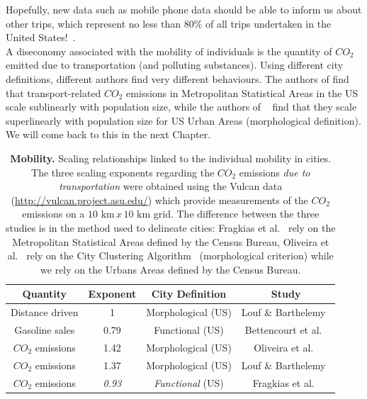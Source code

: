 Hopefully, new data such as mobile phone data should be
able to inform us about other trips, which represent no less than 80\% of all
trips undertaken in the United States!~\cite{FHWA-PL-11-022}.\\

A diseconomy associated with the mobility of individuals is the
quantity of $CO_2$ emitted due to transportation (and polluting substances).
Using different city definitions, different authors find very different
behaviours. The authors of \cite{Fragkias:2013} find that transport-related
$CO_2$ emissions in Metropolitan Statistical Areas in the US scale sublinearly
with population size, while the authors of
~\cite{Louf:2014_mobility,Oliveira:2014} find that they scale superlinearly with
population size for US Urban Areas (morphological definition). We will come back
to this in the next Chapter.

\begin{table}[!h]
    \centering
\begin{tabular}{|cccc|}
\hline
Quantity & Exponent & City Definition & Study\\
\hline
Distance driven & 1 & Morphological (US) & Louf \& Barthelemy~\cite{Louf:2014_scaling} \\
Gasoline sales & 0.79 & Functional (US) & Bettencourt et al.~\cite{Bettencourt:2007}\\
\hline
$CO_2$ emissions & 1.42 & Morphological (US) & Oliveira et al.~\cite{Oliveira:2014}\\
$CO_2$ emissions & 1.37 & Morphological (US) & Louf \&
Barthelemy~\cite{Louf:2014_smog}\\
$CO_2$ emissions & \emph{0.93} & \emph{Functional} (US) & Fragkias et al.~\cite{Fragkias:2013}\\
\hline
\end{tabular}
\caption{{\bf Mobility. } Scaling relationships linked to the individual
    mobility in cities. The three scaling exponents regarding the $CO_2$
    emissions \emph{due to transportation} were obtained using the
    Vulcan data (\url{http://vulcan.project.asu.edu/}) which provide
    measurements of the $CO_2$ emissions on a $10\text{ km}\,x\,10\text{ km}$
    grid. The difference between the three studies is in the method used to
    delineate cities: Fragkias et al.~\cite{Fragkias:2013} rely on the Metropolitan Statistical Areas
    defined by the Census Bureau, Oliveira et al.~\cite{Oliveira:2014} rely on
    the City Clustering Algorithm~\cite{Rozenfeld:2008} (morphological
    criterion) while we rely on the Urbans Areas defined by the Census Bureau.
}
\end{table}



